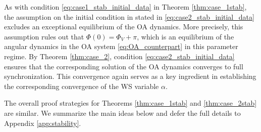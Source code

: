 \documentclass[10pt]{article}
\theoremstyle{definition}
\theoremstyle{definition}
\numberwithin{equation}{section}
\newcommand{\PhiV}{\Phi_{V}}
\begin{document}
As with condition \eqref{eq:case1_stab_initial_data} in Theorem \ref{thm:case_1stab}, the assumption on the initial condition in stated in \eqref{eq:case2_stab_initial_data}  excludes an exceptional equilibrium of the OA dynamics. More precisely, this assumption rules out that $\Phi(0) = \PhiV + \pi$,
which is an equilibrium of the angular dynamics in the OA system \eqref{eq:OA_counterpart} in this parameter regime. By Theorem \ref{thm:case_2}, condition \eqref{eq:case2_stab_initial_data} ensures that the corresponding solution of the OA dynamics converges to full synchronization. 
This convergence again serves as a key ingredient in establishing the corresponding convergence of the WS variable $\alpha$.

\medskip 

The overall proof strategies for Theorems \ref{thm:case_1stab} and \ref{thm:case_2stab} are similar.
We summarize the main ideas below and defer the full details to Appendix \ref{app:stability}.
\end{document}
